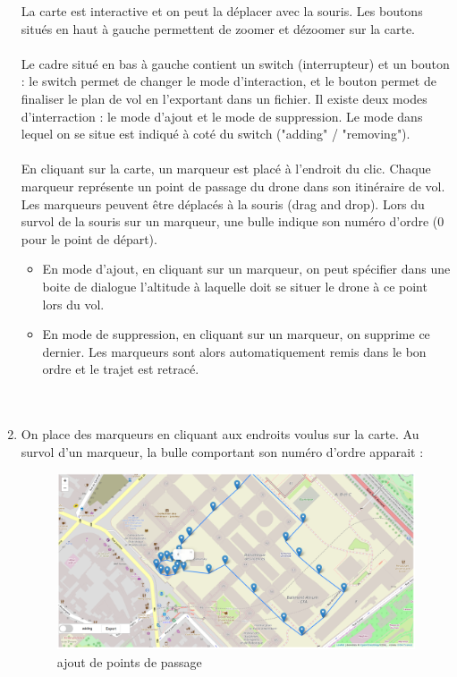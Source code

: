 \documentclass{article}
\begin{document}
\begin{enumerate}
 	La carte est interactive et on peut la déplacer avec la souris.
  Les boutons situés en haut à gauche permettent de zoomer et dézoomer sur la carte.\\ \\
 Le cadre situé en bas à gauche contient un switch (interrupteur) et un bouton : le switch permet de changer le mode d'interaction, et le bouton permet de finaliser le plan de vol en l'exportant dans un fichier.
 Il existe deux modes d'interraction :  le mode d'ajout et le mode de suppression. Le mode dans lequel on se situe est indiqué à coté du switch ("adding" / "removing").\\ \\
  En cliquant sur la carte, un marqueur est placé à l'endroit du clic. Chaque marqueur représente un point de passage du drone dans son itinéraire de vol. Les marqueurs peuvent être déplacés à la souris (drag and drop). Lors du survol de la souris sur un marqueur, une bulle indique son numéro d'ordre (0 pour le point de départ).\\
  	\begin{itemize}
 	\item En mode d'ajout, en cliquant sur un marqueur, on peut spécifier dans une boite de dialogue l'altitude à laquelle doit se situer le drone à ce point lors du vol.\\

 	\item En mode de suppression, en cliquant sur un marqueur, on supprime ce dernier. Les marqueurs sont alors automatiquement remis dans le bon ordre et le trajet est retracé.\\ \\ \\
	\end{itemize}
    \medbreak
   	\newpage
   	\item On place des marqueurs en cliquant aux endroits voulus sur la carte. Au survol d'un marqueur, la bulle comportant son numéro d'ordre apparait :
 	\begin{figure}[!h]
 	\begin{center}
 	\includegraphics[scale=0.42]{capt3.PNG}
 	\caption{ajout de points de passage}
 	\end{center}
 	\end{figure}
 	

\end{enumerate}
\end{document}
